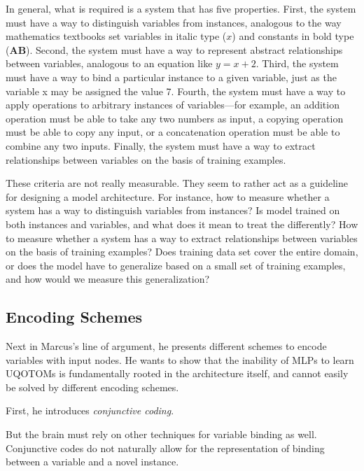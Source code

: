 \documentclass[../../main.tex]{subfiles}
\begin{document}
\begin{citecallout}
    In general, what is required is a system that has five properties. First,
    the system must have a way to distinguish variables from instances,
    analogous to the way mathematics textbooks set variables in italic type
    ($x$) and constants in bold type ($\bm{AB}$). Second, the system must have a way
    to represent abstract relationships between variables, analogous to an
    equation like $y = x + 2$. Third, the system must have a way to bind a
    particular instance to a given variable, just as the variable x may be
    assigned the value 7. Fourth, the system must have a way to apply operations to arbitrary instances of variables—for example, an addition
    operation must be able to take any two numbers as input, a copying
    operation must be able to copy any input, or a concatenation operation
    must be able to combine any two inputs. Finally, the system must have a
    way to extract relationships between variables on the basis of training
    examples.
\end{citecallout}

\begin{critique}
    These criteria are not really measurable. They seem to rather act as a guideline for designing a model architecture. For instance, how to measure whether a system has a way to distinguish variables from instances? Is model trained on both instances and variables, and what does it mean to treat the differently? How to measure whether a system has a way to extract relationships between variables on the basis of training examples? Does training data set cover the entire domain, or does the model have to generalize based on a small set of training examples, and how would we measure this generalization?
\end{critique}

\subsection{Encoding Schemes}
Next in Marcus's line of argument, he presents different schemes to encode variables with input nodes. He wants to show that the inability of MLPs to learn UQOTOMs is fundamentally rooted in the architecture itself, and cannot easily be solved by different encoding schemes.

First, he introduces \emph{conjunctive coding}.

\begin{citecallout}
    But the brain must rely on other techniques for variable binding as
    well. Conjunctive codes do not naturally allow for the representation of
    binding between a variable and a novel instance.
\end{citecallout}
\end{document}
